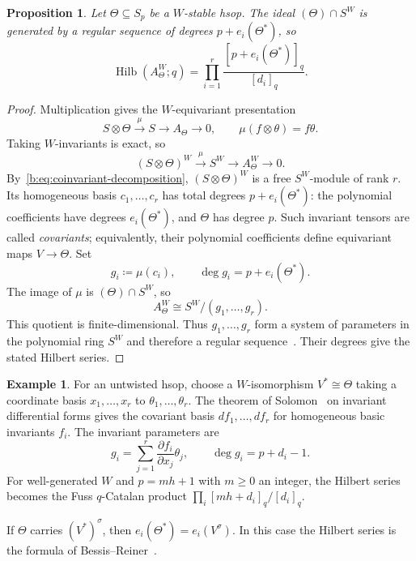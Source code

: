\documentclass[11pt]{amsart}
\newcommand{\defeq}{\coloneqq}
\newcommand{\defn}[1]{\emph{\color{darkblue}#1}}
\newtheorem{proposition}[theorem]{Proposition}
\theoremstyle{definition}
\newtheorem{example}[theorem]{Example}
\DeclareMathOperator{\Hilb}{Hilb}\DeclareMathOperator{\Res}{Res}
\begin{document}
\begin{proposition}\label{b:prop:invariant-parameters}
Let $\Theta\subseteq S_p$ be a $W$-stable hsop. The ideal
$(\Theta)\cap S^W$ is generated by a regular sequence of degrees
$p+e_i(\Theta^*)$, so
\begin{equation}\label{b:eq:invariant-parameter-hilbert}
 \Hilb(A_\Theta^W;q)
 =\prod_{i=1}^r\frac{[p+e_i(\Theta^*)]_q}{[d_i]_q}.
\end{equation}
\end{proposition}
\begin{proof}
Multiplication gives the $W$-equivariant presentation
\[
 S\otimes\Theta\xrightarrow{\ \mu\ }S
 \longrightarrow A_\Theta\longrightarrow0,
 \qquad \mu(f\otimes\theta)=f\theta.
\]
Taking $W$-invariants is exact, so
\[
 (S\otimes\Theta)^W\xrightarrow{\ \mu\ }S^W
 \longrightarrow A_\Theta^W\longrightarrow0.
\]
By~\cref{b:eq:coinvariant-decomposition}, $(S\otimes\Theta)^W$
is a free $S^W$-module of rank $r$. Its homogeneous basis
$c_1,\ldots,c_r$ has total degrees $p+e_i(\Theta^*)$: the polynomial
coefficients have degrees $e_i(\Theta^*)$, and $\Theta$ has degree $p$.
Such invariant tensors are called \defn{covariants}; equivalently,
their polynomial coefficients define equivariant maps $V\to\Theta$.
Set
\[
 g_i\defeq\mu(c_i),\qquad \deg g_i=p+e_i(\Theta^*).
\]
The image of $\mu$ is $(\Theta)\cap S^W$, so
\[
 A_\Theta^W\cong S^W/(g_1,\ldots,g_r).
\]
This quotient is finite-dimensional. Thus $g_1,\ldots,g_r$ form a
system of parameters in the polynomial ring $S^W$ and therefore a
regular sequence~\cite[Lemmas~10.104.2 and~10.104.7]{Stacks}.
Their degrees give the stated Hilbert series.
\end{proof}

\begin{example}\label{ex:invariant-parameters}
For an untwisted hsop, choose a $W$-isomorphism $V^*\cong\Theta$
taking a coordinate basis $x_1,\ldots,x_r$ to
$\theta_1,\ldots,\theta_r$. The theorem of Solomon~\cite[Theorem~2.3]{AW}
on invariant differential forms gives the covariant basis
$df_1,\ldots,df_r$ for homogeneous basic invariants $f_i$.
The invariant parameters are
\[
 g_i=\sum_{j=1}^r\frac{\partial f_i}{\partial x_j}\theta_j,
 \qquad \deg g_i=p+d_i-1.
\]
For well-generated $W$ and $p=mh+1$ with $m\ge0$ an integer,
the Hilbert series becomes the
Fuss $q$-Catalan product $\prod_i[mh+d_i]_q/[d_i]_q$.
\end{example}

If $\Theta$ carries $(V^*)^\sigma$, then
$e_i(\Theta^*)=e_i(V^\sigma)$. In this case the Hilbert series is
the formula of Bessis--Reiner~\cite[Proposition~4.2]{BR}.
\end{document}
